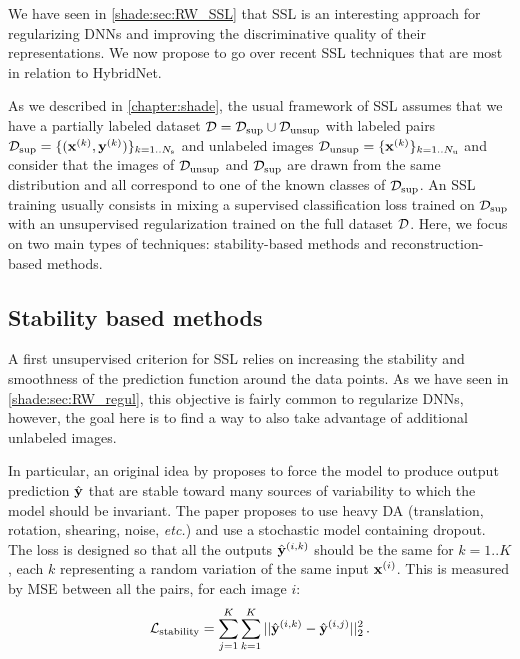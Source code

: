 We have seen in \autoref{shade:sec:RW_SSL} that \acf{SSL} is an interesting approach for regularizing \acfp{DNN} and improving the discriminative quality of their representations. We now propose to go over recent \ac{SSL} techniques that are most in relation to HybridNet.

As we described in \autoref{chapter:shade}, the usual framework of \ac{SSL} assumes that we have a partially labeled dataset $\mathcal{D} = \mathcal{D}_\mathrm{sup} \cup \mathcal{D}_\mathrm{unsup}$ with labeled pairs $\mathcal{D}_\mathrm{sup} = \{(\mathbf{x}^{(k)}, \mathbf{y}^{(k)})\}_{k=1..N_\mathrm{s}}$ and unlabeled images $\mathcal{D}_\mathrm{unsup} = \{\mathbf{x}^{(k)}\}_{k=1..N_\mathrm{u}}$ and consider that the images of $\mathcal{D}_\mathrm{unsup}$ and $\mathcal{D}_\mathrm{sup}$ are drawn from the same distribution and all correspond to one of the known classes of $\mathcal{D}_\mathrm{sup}$. An \ac{SSL} training usually consists in mixing a supervised classification loss trained on $\mathcal{D}_\mathrm{sup}$ with an unsupervised regularization trained on the full dataset $\mathcal{D}$. Here, we focus on two main types of techniques: stability-based methods and reconstruction-based methods.

\subsection{Stability based methods}

A first unsupervised criterion for \ac{SSL} relies on increasing the stability and smoothness of the prediction function around the data points. As we have seen in \autoref{shade:sec:RW_regul}, this objective is fairly common to regularize \acp{DNN}, however, the goal here is to find a way to also take advantage of additional unlabeled images.

In particular, an original idea by \citet{Sajjadi2016} proposes to force the model to produce output prediction $\hat{\mathbf{y}}$ that are stable toward many sources of variability to which the model should be invariant. The paper proposes to use heavy \ac{DA} (translation, rotation, shearing, noise, \textit{etc.}) and use a stochastic model containing dropout. The loss is designed so that all the outputs $\hat{\mathbf{y}}^{(i,k)}$ should be the same for $k=1..K$, each $k$ representing a random variation of the same input $\mathbf{x}^{(i)}$. This is measured by \ac{MSE} between all the pairs, for each image $i$:
\begin{equation}
  \mathcal{L}_\mathrm{stability} = \sum_{j=1}^K\sum_{k=1}^K||\hat{\mathbf{y}}^{(i,k)} - \hat{\mathbf{y}}^{(i,j)}||_2^2\,.
\end{equation}

